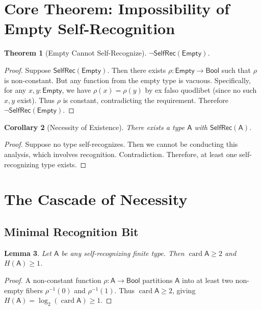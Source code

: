 \documentclass[12pt,a4paper]{article}
\newtheorem{theorem}{Theorem}
\newtheorem{lemma}[theorem]{Lemma}
\newtheorem{corollary}[theorem]{Corollary}
\DeclareMathOperator{\card}{card}
\newcommand{\Bool}{\mathsf{Bool}}
\begin{document}
\section{Core Theorem: Impossibility of Empty Self-Recognition}

\begin{theorem}[Empty Cannot Self-Recognize]\label{thm:empty}
$\neg \mathsf{SelfRec}(\mathsf{Empty})$.
\end{theorem}

\begin{proof}
Suppose $\mathsf{SelfRec}(\mathsf{Empty})$. Then there exists $\rho : \mathsf{Empty} \to \Bool$ such that $\rho$ is non-constant. But any function from the empty type is vacuous. Specifically, for any $x, y : \mathsf{Empty}$, we have $\rho(x) = \rho(y)$ by ex falso quodlibet (since no such $x, y$ exist). Thus $\rho$ is constant, contradicting the requirement. Therefore $\neg \mathsf{SelfRec}(\mathsf{Empty})$.
\end{proof}

\begin{corollary}[Necessity of Existence]\label{cor:existence}
There exists a type $\mathsf{A}$ with $\mathsf{SelfRec}(\mathsf{A})$.
\end{corollary}

\begin{proof}
Suppose no type self-recognizes. Then we cannot be conducting this analysis, which involves recognition. Contradiction. Therefore, at least one self-recognizing type exists.
\end{proof}

\section{The Cascade of Necessity}

\subsection{Minimal Recognition Bit}

\begin{lemma}\label{lem:minbit}
Let $\mathsf{A}$ be any self-recognizing finite type. Then $\card \mathsf{A} \geq 2$ and $H(\mathsf{A}) \geq 1$.
\end{lemma}

\begin{proof}
A non-constant function $\rho : \mathsf{A} \to \Bool$ partitions $\mathsf{A}$ into at least two non-empty fibers $\rho^{-1}(0)$ and $\rho^{-1}(1)$. Thus $\card \mathsf{A} \geq 2$, giving $H(\mathsf{A}) = \log_2(\card \mathsf{A}) \geq 1$.
\end{proof}
\end{document}
